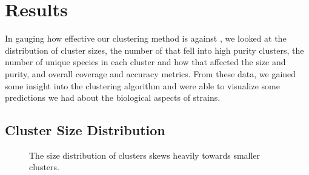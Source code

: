 \section{Results}\label{sec:results:clustering}
In gauging how effective our clustering method is against \cplop{}, we looked at the distribution of cluster sizes, the number of \isols{} that fell into high purity clusters, the number of unique species in each cluster and how that affected the size and purity, and overall coverage and accuracy metrics.
From these data, we gained some insight into the clustering algorithm and were able to visualize some predictions we had about the biological aspects of strains.  

\subsection{Cluster Size Distribution}
\begin{figure}
    \centering
    \hfill
    \hfill
    \caption{The size distribution of clusters skews heavily towards smaller clusters.}
    \label{fig:clust_size_dist}
\end{figure}

